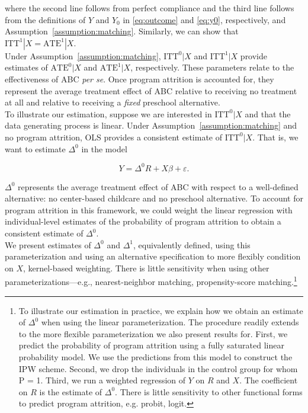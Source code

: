 \noindent where the second line follows from perfect compliance and the third line follows from the definitions of $Y$ and $Y_{0}$ in \eqref{eq:outcome} and \eqref{eq:y0}, respectively, and Assumption~\ref{assumption:matching}. Similarly, we can show that $\text{ITT}^1 | X = \text{ATE}^1 | X$.\\

\noindent Under Assumption~\ref{assumption:matching}, $\text{ITT}^0 | X $ and $\text{ITT}^1 | X $ provide estimates of $\text{ATE}^0 | X$ and $\text{ATE}^1 | X$, respectively. These parameters relate to the effectiveness of ABC \emph{per se}. Once program attrition is accounted for, they represent the average treatment effect of ABC relative to receiving no treatment at all and relative to receiving a \textit{fixed} preschool alternative.\\

\noindent To illustrate our estimation, suppose we are interested in $\text{ITT}^0|X$ and that the data generating process is linear. Under Assumption~\ref{assumption:matching} and no program attrition, OLS provides a consistent estimate of $\text{ITT}^0|X$. That is, we want to estimate $\Delta^0$ in the model

\begin{equation}
Y = \Delta^0 R + X \beta + \varepsilon. \label{eq:ittmodel}
\end{equation}

\noindent $\Delta^0$ represents the average treatment effect of ABC with respect to a well-defined alternative: no center-based childcare and no preschool alternative. To account for program attrition in this framework, we could weight the linear regression with individual-level estimates of the probability of program attrition to obtain a consistent estimate of $\Delta^0$.\\

\noindent We present estimates of $\Delta^0$ and $\Delta^1$, equivalently defined, using this parameterization and using an alternative specification to more flexibly condition on $X$, kernel-based weighting. There is little sensitivity when using other parameterizations---e.g., nearest-neighbor matching, propensity-score matching.\footnote{To illustrate our estimation in practice, we explain how we obtain an estimate of $\Delta^0$ when using the linear parameterization. The procedure readily extends to the more flexible parameterization we also present results for. First, we predict the probability of program attrition using a fully saturated linear probability model. We use the predictions from this model to construct the IPW scheme. Second, we drop the individuals in the control group for whom P = 1. Third, we run a weighted regression of $Y$ on $R$ and $X$. The coefficient on $ R $ is the estimate of $\Delta^0$. There is little sensitivity to other functional forms to predict program attrition, e.g. probit, logit.}


